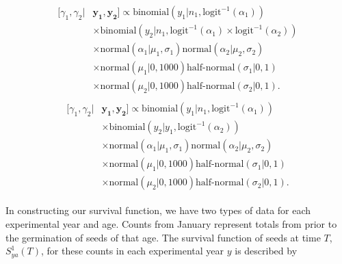 \documentclass[12pt, oneside, titlepage]{article}   	%
\begin{document}
\begin{align}
  \begin{split}
 [  \gamma_1, \gamma_2  | & \bm{y_1} , \bm{y_2} ] \propto 
   \mathrm{binomial} ( y_1 | n_1, \mathrm{logit}^{-1}( \alpha_1 ) )  
      \\ & \times \mathrm{binomial} ( y_2 | n_1, \mathrm{logit}^{-1}( \alpha_1 ) \times \mathrm{logit}^{-1}( \alpha_2 ) ) 
   \\ & \times \mathrm{normal} ( \alpha_1  | \mu_1, \sigma_1 ) \mathrm{normal} ( \alpha_2  | \mu_2, \sigma_2 )
  \\ & \times \mathrm{normal} ( \mu_1 | 0 , 1000 ) \textrm{half-normal} ( \sigma_1 | 0,1)
    \\ & \times \mathrm{normal} ( \mu_2 | 0 , 1000 ) \textrm{half-normal} ( \sigma_2 | 0,1).
  \end{split}
\end{align}
%
\begin{align}
  \begin{split}
 [  \gamma_1, \gamma_2  | & \bm{y_1} , \bm{y_2} ] \propto 
   \mathrm{binomial} ( y_1 | n_1, \mathrm{logit}^{-1}( \alpha_1 ) )
      \\ & \times  \mathrm{binomial} ( y_2 | y_1, \mathrm{logit}^{-1}( \alpha_2 ) ) 
   \\ & \times \mathrm{normal} ( \alpha_1  | \mu_1, \sigma_1 ) \mathrm{normal} ( \alpha_2  | \mu_2, \sigma_2 )
  \\ & \times \mathrm{normal} ( \mu_1 | 0 , 1000 ) \textrm{half-normal} ( \sigma_1 | 0,1)
    \\ & \times \mathrm{normal} ( \mu_2 | 0 , 1000 ) \textrm{half-normal} ( \sigma_2 | 0,1).
  \end{split}
\end{align}
%

\clearpage
\newpage





In constructing our survival function, we have two types of data for each experimental year and age. Counts from January represent totals from prior to the germination of seeds of that age. The survival function of seeds at time $T$, $S^1_{ya}(T)$, for these counts in each experimental year $y$ is described by 
%
%
\end{document}

